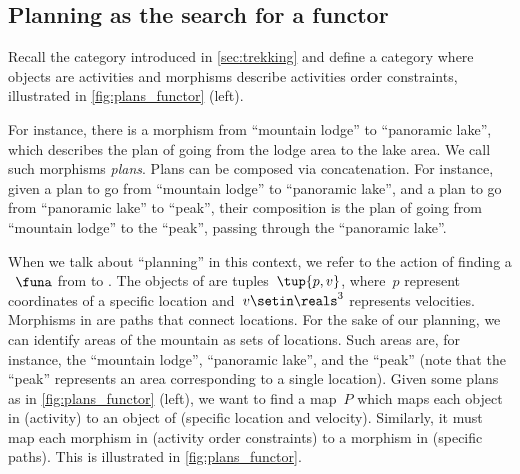 \subsection{Planning as the search for a functor}
\label{sec:planning-as-functor}

\begin{example}
    \label{exa:planning-as-search-functor}
    Recall the category \Berg introduced in \cref{sec:trekking} and define a category \Plans where objects are activities and morphisms describe activities order constraints, illustrated in \cref{fig:plans_functor} (left).

    For instance, there is a morphism from ``mountain lodge'' to ``panoramic lake'', which describes the plan of going from the lodge area to the lake area.
    We call such morphisms \emph{plans}.
    Plans can be composed via concatenation.
    For instance, given a plan to go from ``mountain lodge'' to ``panoramic lake'', and a plan to go from ``panoramic lake'' to ``peak'', their composition is the plan of going from ``mountain lodge'' to the ``peak'', passing through the ``panoramic lake''.

    When we talk about ``planning'' in this context, we refer to the action of finding a ~$\funa$ from \Plans to \Berg.
    The objects of \Berg are tuples~$\tup{p,v}$, where~$p$ represent coordinates of a specific location and~$v\setin \reals^3$ represents velocities.
    Morphisms in \Berg are paths that connect locations.
    For the sake of our planning, we can identify areas of the mountain as sets of locations.
    Such areas are, for instance, the ``mountain lodge'', ``panoramic lake'', and the
    ``peak'' (note that the ``peak'' represents an area corresponding to a single location).
    Given some plans as in \cref{fig:plans_functor} (left), we want to find a map~$P$ which maps each object in \Plans (activity) to an object of \Berg (specific location and velocity).
    Similarly, it must map each morphism in \Plans (activity order constraints) to a morphism in \Berg (specific paths).
    This is illustrated in \cref{fig:plans_functor}.
\end{example}

\begin{figure*}[h!]
    \centering
    \caption{Planning .}
    \label{fig:plans_functor}
\end{figure*}

\vfill
\clearpage
\vfill





